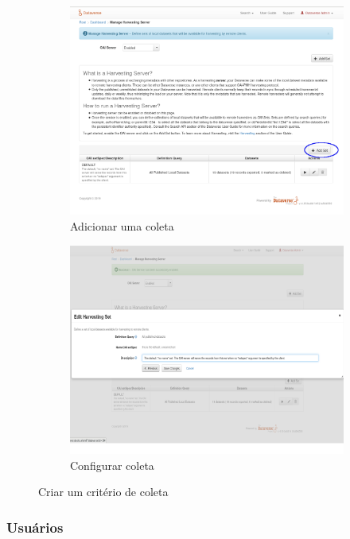 \documentclass[12pt,hidelinks]{article}
\begin{document}
 \begin{figure}[ht]
\begin{subfigure}{.5\textwidth}
  \centering
  \includegraphics[width=.9\linewidth]{imagens/03.png}  
  \caption{Adicionar uma coleta}
  \label{img04.png}
\end{subfigure}
\begin{subfigure}{.5\textwidth}
  \centering
  \includegraphics[width=.9\linewidth]{imagens/05.png}  
  \caption{Configurar coleta}
  \label{img05.png}
\end{subfigure}
\caption{Criar um critério de coleta}
\label{img0405}
\end{figure}
 
\newpage
\subsubsection{Usuários}
\end{document}
